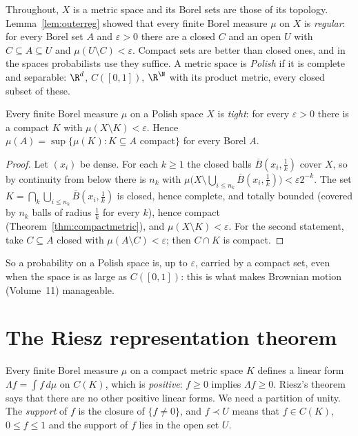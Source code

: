 Throughout, $X$ is a metric space and its Borel sets are those of its topology. Lemma~\ref{lem:outerreg} showed that every finite Borel measure $\mu$ on $X$ is \emph{regular}: for every Borel
set $A$ and $\varepsilon>0$ there are a closed $C$ and an open $U$ with $C\subseteq A\subseteq U$ and $\mu(U\setminus C)<\varepsilon$. Compact sets are better than closed ones, and in the spaces probabilists use they
suffice. A metric space is \emph{Polish} if it is complete and separable: $\R^d$, $C([0,1])$, $\R^\N$ with its product metric, every closed subset of these.

\begin{theorem}[Ulam]\label{thm:ulam}
Every finite Borel measure $\mu$ on a Polish space $X$ is \emph{tight}: for every $\varepsilon>0$ there is a compact $K$ with $\mu(X\setminus K)<\varepsilon$. Hence $\mu(A)=\sup\{\mu(K):K\subseteq A\text{ compact}\}$ for every
Borel $A$.
\end{theorem}
\begin{proof}
Let $(x_i)$ be dense. For each $k\ge1$ the closed balls $\overline B(x_i,\frac1k)$ cover $X$, so by continuity from below there is $n_k$ with $\mu\bigl(X\setminus\bigcup_{i\le n_k}\overline B(x_i,\frac1k)\bigr)<\varepsilon2^{-k}$. The set
$K=\bigcap_k\bigcup_{i\le n_k}\overline B(x_i,\frac1k)$ is closed, hence complete, and totally bounded (covered by $n_k$ balls of radius $\frac1k$ for every $k$), hence compact (Theorem~\ref{thm:compactmetric}), and
$\mu(X\setminus K)<\varepsilon$. For the second statement, take $C\subseteq A$ closed with $\mu(A\setminus C)<\varepsilon$; then $C\cap K$ is compact.
\end{proof}

So a probability on a Polish space is, up to $\varepsilon$, carried by a compact set, even when the space is as large as $C([0,1])$: this is what makes Brownian motion (Volume~11) manageable.

\section{The Riesz representation theorem}

Every finite Borel measure $\mu$ on a compact metric space $K$ defines a linear form $\Lambda f=\int f\,d\mu$ on $C(K)$, which is \emph{positive}: $f\ge0$ implies $\Lambda f\ge0$. Riesz's theorem says that there are no other
positive linear forms. We need a partition of unity. The \emph{support} of $f$ is the closure of $\{f\ne0\}$, and $f\prec U$ means that $f\in C(K)$, $0\le f\le1$ and the support of $f$ lies in the open set $U$.

